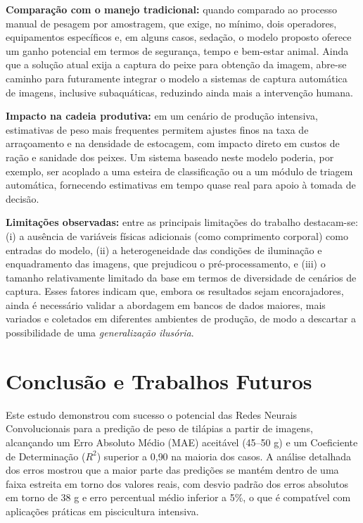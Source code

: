 \documentclass[sigconf,nonacm,screen]{acmart}
\begin{document}
\textbf{Comparação com o manejo tradicional:} quando comparado ao processo manual de pesagem por amostragem, que exige, no mínimo, dois operadores, equipamentos específicos e, em alguns casos, sedação, o modelo proposto oferece um ganho potencial em termos de segurança, tempo e bem-estar animal. Ainda que a solução atual exija a captura do peixe para obtenção da imagem, abre-se caminho para futuramente integrar o modelo a sistemas de captura automática de imagens, inclusive subaquáticas, reduzindo ainda mais a intervenção humana.

\textbf{Impacto na cadeia produtiva:} em um cenário de produção intensiva, estimativas de peso mais frequentes permitem ajustes finos na taxa de arraçoamento e na densidade de estocagem, com impacto direto em custos de ração e sanidade dos peixes. Um sistema baseado neste modelo poderia, por exemplo, ser acoplado a uma esteira de classificação ou a um módulo de triagem automática, fornecendo estimativas em tempo quase real para apoio à tomada de decisão.

\textbf{Limitações observadas:} entre as principais limitações do trabalho destacam-se: (i) a ausência de variáveis físicas adicionais (como comprimento corporal) como entradas do modelo, (ii) a heterogeneidade das condições de iluminação e enquadramento das imagens, que prejudicou o pré-processamento, e (iii) o tamanho relativamente limitado da base em termos de diversidade de cenários de captura. Esses fatores indicam que, embora os resultados sejam encorajadores, ainda é necessário validar a abordagem em bancos de dados maiores, mais variados e coletados em diferentes ambientes de produção, de modo a descartar a possibilidade de uma \textit{generalização ilusória}.

\section{Conclusão e Trabalhos Futuros}
Este estudo demonstrou com sucesso o potencial das Redes Neurais Convolucionais para a predição de peso de tilápias a partir de imagens, alcançando um Erro Absoluto Médio (MAE) aceitável (45--50 g) e um Coeficiente de Determinação ($R^2$) superior a 0{,}90 na maioria dos casos. A análise detalhada dos erros mostrou que a maior parte das predições se mantém dentro de uma faixa estreita em torno dos valores reais, com desvio padrão dos erros absolutos em torno de 38 g e erro percentual médio inferior a 5\%, o que é compatível com aplicações práticas em piscicultura intensiva.
\end{document}
